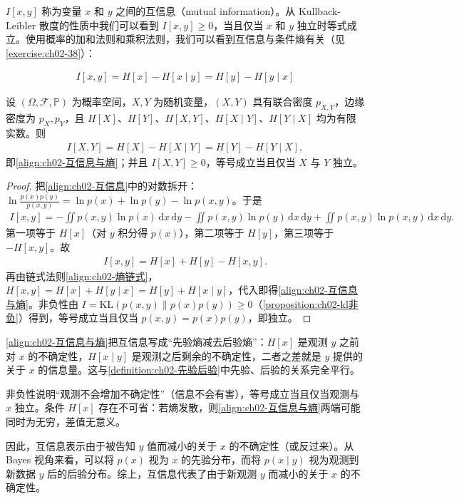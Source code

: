 \documentclass[../../main.tex]{subfiles}
\begin{document}
$I[x,y]$ 称为变量 $x$ 和 $y$ 之间的互信息（mutual information）。从 Kullback-Leibler 散度的性质中我们可以看到 $I[x,y]\geqslant0$，当且仅当 $x$ 和 $y$ 独立时等式成立。使用概率的加和法则和乘积法则，我们可以看到互信息与条件熵有关（见\cref{exercise:ch02-38}）：

\begin{align}
  I[x,y] = H[x] - H[x\mid y] = H[y] - H[y\mid x]
  \label{align:ch02-互信息与熵}
\end{align}

\begin{proposition}[互信息与熵的关系]\label{proposition:ch02-互信息与熵}
设 $(\Omega,\mathcal{F},\mathbb{P})$ 为概率空间，$X,Y$ 为随机变量，$(X,Y)$ 具有联合密度 $p_{X,Y}$，边缘密度为 $p_X,p_Y$，且 $H[X]$、$H[Y]$、$H[X,Y]$、$H[X\mid Y]$、$H[Y\mid X]$ 均为有限实数。则
\begin{align*}
  I[X,Y]=H[X]-H[X\mid Y]=H[Y]-H[Y\mid X],
\end{align*}
即\eqref{align:ch02-互信息与熵}；并且 $I[X,Y]\geqslant0$，等号成立当且仅当 $X$ 与 $Y$ 独立。
\end{proposition}

\begin{proof}
把\eqref{align:ch02-互信息}中的对数拆开：$\ln\frac{p(x)p(y)}{p(x,y)} = \ln p(x)+\ln p(y)-\ln p(x,y)$。于是
\begin{align*}
  I[x,y] = -\iint p(x,y)\ln p(x)\,\mathrm{d}x\,\mathrm{d}y - \iint p(x,y)\ln p(y)\,\mathrm{d}x\,\mathrm{d}y + \iint p(x,y)\ln p(x,y)\,\mathrm{d}x\,\mathrm{d}y .
\end{align*}
第一项等于 $H[x]$（对 $y$ 积分得 $p(x)$），第二项等于 $H[y]$，第三项等于 $-H[x,y]$。故
\begin{align*}
  I[x,y] = H[x] + H[y] - H[x,y] .
\end{align*}
再由链式法则\eqref{align:ch02-熵链式}，$H[x,y]=H[x]+H[y\mid x]=H[y]+H[x\mid y]$，代入即得\eqref{align:ch02-互信息与熵}。非负性由 $I=\mathrm{KL}(p(x,y)\|p(x)p(y))\geqslant0$（\cref{proposition:ch02-kl非负}）得到，等号成立当且仅当 $p(x,y)=p(x)p(y)$，即独立。
\end{proof}

\begin{remark}
\eqref{align:ch02-互信息与熵}把互信息写成“先验熵减去后验熵”：$H[x]$ 是观测 $y$ 之前对 $x$ 的不确定性，$H[x\mid y]$ 是观测之后剩余的不确定性，二者之差就是 $y$ 提供的关于 $x$ 的信息量。这与\cref{definition:ch02-先验后验}中先验、后验的关系完全平行。

非负性说明“观测不会增加不确定性”（信息不会有害），等号成立当且仅当观测与 $x$ 独立。条件 $H[x]$ 存在不可省：若熵发散，则\eqref{align:ch02-互信息与熵}两端可能同时为无穷，差值无意义。
\end{remark}

因此，互信息表示由于被告知 $y$ 值而减小的关于 $x$ 的不确定性（或反过来）。从 Bayes 视角来看，可以将 $p(x)$ 视为 $x$ 的先验分布，而将 $p(x\mid y)$ 视为观测到新数据 $y$ 后的后验分布。综上，互信息代表了由于新观测 $y$ 而减小的关于 $x$ 的不确定性。
\end{document}
